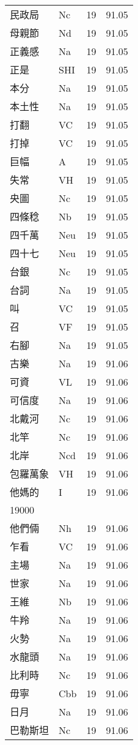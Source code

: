 \documentclass[twocolumn]{book}
\begin{document}
\begin{supertabular}{llrr}
民政局 & Nc & 19 &  91.05\\
母親節 & Nd & 19 &  91.05\\
正義感 & Na & 19 &  91.05\\
正是 & SHI & 19 &  91.05\\
本分 & Na & 19 &  91.05\\
本土性 & Na & 19 &  91.05\\
打翻 & VC & 19 &  91.05\\
打掉 & VC & 19 &  91.05\\
巨幅 & A & 19 &  91.05\\
失常 & VH & 19 &  91.05\\
央圖 & Nc & 19 &  91.05\\
四條稔 & Nb & 19 &  91.05\\
四千萬 & Neu & 19 &  91.05\\
四十七 & Neu & 19 &  91.05\\
台銀 & Nc & 19 &  91.05\\
台詞 & Na & 19 &  91.05\\
叫 & VC & 19 &  91.05\\
召 & VF & 19 &  91.05\\
右腳 & Na & 19 &  91.05\\
古樂 & Na & 19 &  91.06\\
可資 & VL & 19 &  91.06\\
可信度 & Na & 19 &  91.06\\
北戴河 & Nc & 19 &  91.06\\
北竿 & Nc & 19 &  91.06\\
北岸 & Ncd & 19 &  91.06\\
包羅萬象 & VH & 19 &  91.06\\
他媽的 & I & 19 &  91.06\\
19000\\
他們倆 & Nh & 19 &  91.06\\
乍看 & VC & 19 &  91.06\\
主場 & Na & 19 &  91.06\\
世家 & Na & 19 &  91.06\\
王維 & Nb & 19 &  91.06\\
牛羚 & Na & 19 &  91.06\\
火勢 & Na & 19 &  91.06\\
水龍頭 & Na & 19 &  91.06\\
比利時 & Nc & 19 &  91.06\\
毋寧 & Cbb & 19 &  91.06\\
日月 & Na & 19 &  91.06\\
巴勒斯坦 & Nc & 19 &  91.06\\

\end{supertabular}
\end{document}
